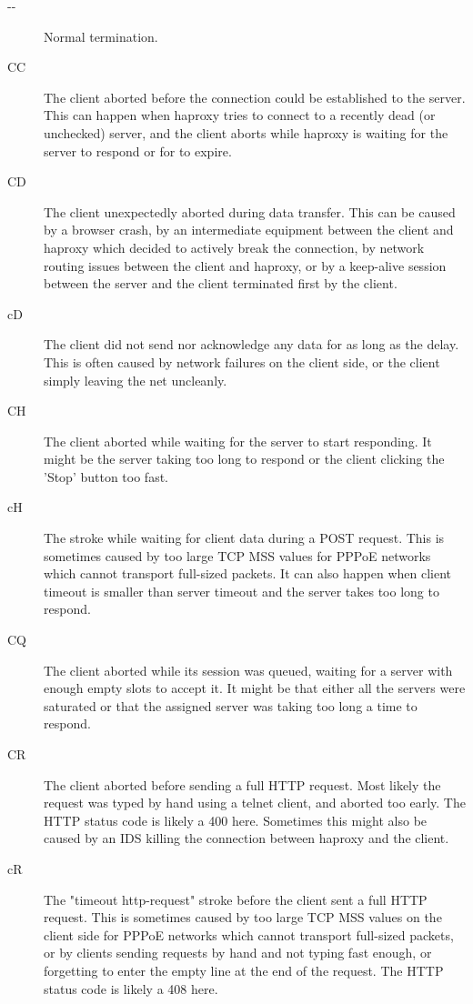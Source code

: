 \begin{description}
     \item[{-}{-}]
          Normal termination.
     \item[CC]   
          The client aborted before the connection could be established to the
          server. This can happen when haproxy tries to connect to a recently
          dead (or unchecked) server, and the client aborts while haproxy is
          waiting for the server to respond or for  to expire.
     \item[CD]
          The client unexpectedly aborted during data transfer. This can be
          caused by a browser crash, by an intermediate equipment between the
          client and haproxy which decided to actively break the connection,
          by network routing issues between the client and haproxy, or by a
          keep-alive session between the server and the client terminated first
          by the client.
     \item[cD]
          The client did not send nor acknowledge any data for as long as the
           delay. This is often caused by network failures on
          the client side, or the client simply leaving the net uncleanly.
     \item[CH]
          The client aborted while waiting for the server to start responding.
          It might be the server taking too long to respond or the client
          clicking the 'Stop' button too fast.
     \item[cH]
          The  stroke while waiting for client data during a
          POST request. This is sometimes caused by too large TCP MSS values
          for PPPoE networks which cannot transport full-sized packets. It can
          also happen when client timeout is smaller than server timeout and
          the server takes too long to respond.
     \item[CQ]
          The client aborted while its session was queued, waiting for a server
          with enough empty slots to accept it. It might be that either all the
          servers were saturated or that the assigned server was taking too
          long a time to respond.
     \item[CR]
          The client aborted before sending a full HTTP request. Most likely
          the request was typed by hand using a telnet client, and aborted
          too early. The HTTP status code is likely a 400 here. Sometimes this
          might also be caused by an IDS killing the connection between haproxy
          and the client.
     \item[cR]
          The "timeout http-request" stroke before the client sent a full HTTP
          request. This is sometimes caused by too large TCP MSS values on the
          client side for PPPoE networks which cannot transport full-sized
          packets, or by clients sending requests by hand and not typing fast
          enough, or forgetting to enter the empty line at the end of the
          request. The HTTP status code is likely a 408 here.


\end{description}
